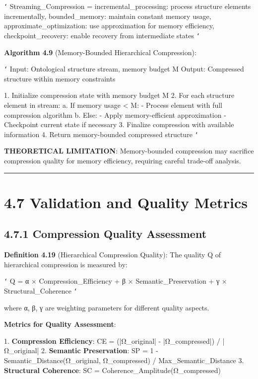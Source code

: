 \texttt{`}
Streaming_Compression = {
    incremental_processing: process structure elements incrementally,
    bounded_memory: maintain constant memory usage,
    approximate_optimization: use approximation for memory efficiency,
    checkpoint_recovery: enable recovery from intermediate states
}
\texttt{`}

\textbf{Algorithm 4.9} (Memory-Bounded Hierarchical Compression):

\texttt{`}
Input: Ontological structure stream, memory budget M
Output: Compressed structure within memory constraints

1. Initialize compression state with memory budget M
2. For each structure element in stream:
   a. If memory usage < M:
      - Process element with full compression algorithm
   b. Else:
      - Apply memory-efficient approximation
      - Checkpoint current state if necessary
3. Finalize compression with available information
4. Return memory-bounded compressed structure
\texttt{`}

\textbf{THEORETICAL LIMITATION}: Memory-bounded compression may sacrifice compression quality for memory efficiency, requiring careful trade-off analysis.

\hrule

\section{4.7 Validation and Quality Metrics}

\subsection{4.7.1 Compression Quality Assessment}

\textbf{Definition 4.19} (Hierarchical Compression Quality): The quality Q of hierarchical compression is measured by:

\texttt{`}
Q = α × Compression_Efficiency + β × Semantic_Preservation + γ × Structural_Coherence
\texttt{`}

where α, β, γ are weighting parameters for different quality aspects.

\textbf{Metrics for Quality Assessment}:

1. \textbf{Compression Efficiency}: CE = (|Ω_original| - |Ω_compressed|) / |Ω_original|
2. \textbf{Semantic Preservation}: SP = 1 - Semantic_Distance(Ω_original, Ω_compressed) / Max_Semantic_Distance
3. \textbf{Structural Coherence}: SC = Coherence_Amplitude(Ω_compressed)

